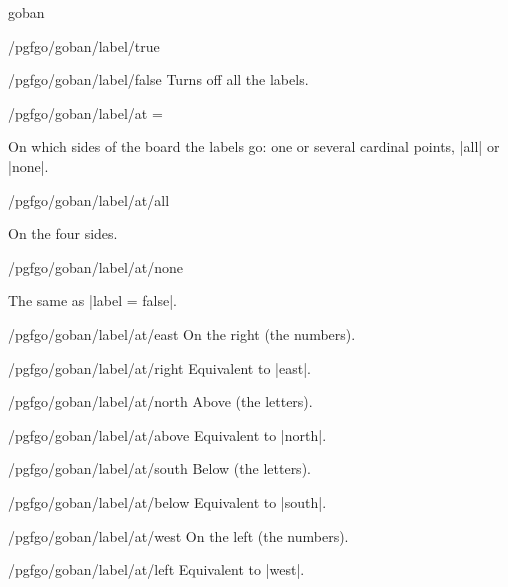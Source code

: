 \begin{environment}{{goban}}
\begin{key}{/pgfgo/goban/label/true}
		\begin{codeexample}[]
			\begin{goban}[5, label]
			\end{goban}
		\end{codeexample}
	\end{key}

	\begin{key}{/pgfgo/goban/label/false}
		Turns off all the labels.
	\end{key}

	\begin{key}{/pgfgo/goban/label/at =}

		On which sides of the board the labels go: one or several cardinal points, |all| or |none|.

		\begin{stylekey}{/pgfgo/goban/label/at/all}

			On the four sides.
		\end{stylekey}

		\begin{stylekey}{/pgfgo/goban/label/at/none}

			The same as |label = false|.
		\end{stylekey}

		\begin{stylekey}{/pgfgo/goban/label/at/east}
			On the right (the numbers).
		\end{stylekey}
		\begin{stylekey}{/pgfgo/goban/label/at/right}
			Equivalent to |east|.
		\end{stylekey}

		\begin{stylekey}{/pgfgo/goban/label/at/north}
			Above (the letters).
		\end{stylekey}
		\begin{stylekey}{/pgfgo/goban/label/at/above}
			Equivalent to |north|.
		\end{stylekey}

		\begin{stylekey}{/pgfgo/goban/label/at/south}
			Below (the letters).
		\end{stylekey}
		\begin{stylekey}{/pgfgo/goban/label/at/below}
			Equivalent to |south|.
		\end{stylekey}

		\begin{stylekey}{/pgfgo/goban/label/at/west}
			On the left (the numbers).
		\end{stylekey}
		\begin{stylekey}{/pgfgo/goban/label/at/left}
			Equivalent to |west|.
		\end{stylekey}


\end{key}
\end{environment}
